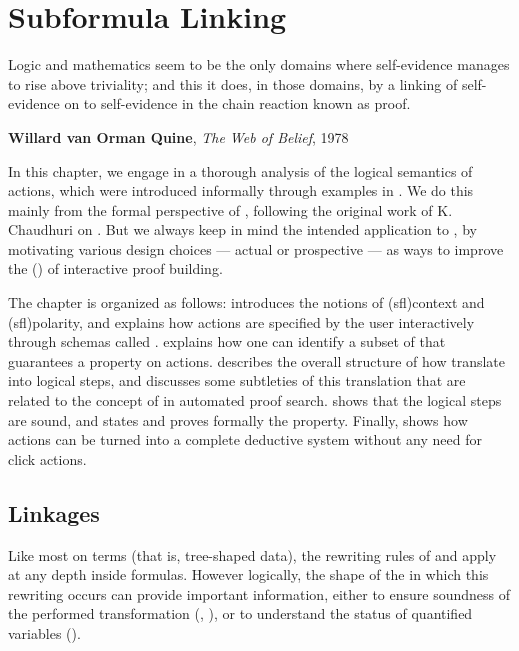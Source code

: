 \setchapterpreamble[u]{\margintoc}
\chapter{Subformula Linking}


\epigraph{Logic and mathematics seem to be the only domains where self-evidence
manages to rise above triviality; and this it does, in those domains, by a
linking of self-evidence on to self-evidence in the chain reaction known as
proof.}{\textbf{Willard van Orman Quine}, \textit{The Web of Belief}, 1978}

In this chapter, we engage in a thorough analysis of the logical semantics of
 actions, which were introduced informally through examples in
. We do this mainly from the formal perspective of  , following the original work of K. Chaudhuri on
\emph{} \cite{Chaudhuri2013}. But we always keep in mind
the intended application to , by motivating various design
choices --- actual or prospective --- as ways to improve the  () of interactive proof building.

The chapter is organized as follows:  introduces the notions of
\kl(sfl){context} and \kl(sfl){polarity}, and explains how  actions are
specified by the user interactively through schemas called \emph{}.
 explains how one can identify a subset of  that
guarantees a  property on  actions. 
describes the overall structure of how  translate into logical
steps, and  discusses some subtleties of this translation that
are related to the concept of \emph{} in automated proof search.
 shows that the logical steps are sound, and
 states and proves formally the  property.
Finally,  shows how  actions can be turned into
a complete deductive system without any need for click actions.

\section{Linkages}

Like most  on terms (that is, tree-shaped data), the
rewriting rules of  and  apply at any depth inside
formulas. However logically, the shape of the \emph{} in which this
rewriting occurs can provide important information, either to ensure soundness
of the performed transformation (, ),
or to understand the status of quantified variables ().

